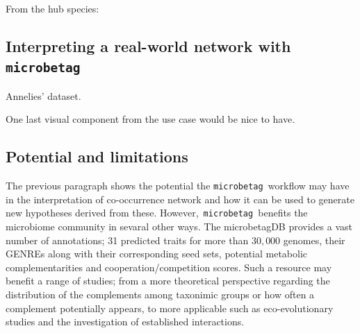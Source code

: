 \documentclass[sn-mathphys,Numbered]{sn-jnl}  %
\theoremstyle{thmstyleone}%
\theoremstyle{thmstyletwo}%
\theoremstyle{thmstylethree}%
\newcommand{\microbetag}{\texttt{microbetag }}
\begin{document}
        From the hub species: 




    \subsection*{Interpreting a real-world network with \microbetag}
        \label{subsec:usecase}


        Annelies' dataset. 

        One last visual component from the use case would be nice to have.  





    \subsection*{Potential and limitations}
    \label{subsec:pot-and-limits}

        The previous paragraph shows the potential the \microbetag workflow may have in the interpretation of co-occurrence network and how it can be used to generate new hypotheses derived from these.
        However,~\microbetag benefits the microbiome community in sevaral other ways. 
        The microbetagDB provides a vast number of annotations; 31 predicted traits for more than $30,000$ genomes, their GENREs along with their corresponding seed sets, potential metabolic complementarities and cooperation/competition scores.
        Such a resource may benefit a range of studies; 
        from a more theoretical perspective regarding the distribution of the complements among taxonimic groups or how often a complement potentially appears, to more applicable such as eco-evolutionary studies and the investigation of established interactions.
\end{document}
